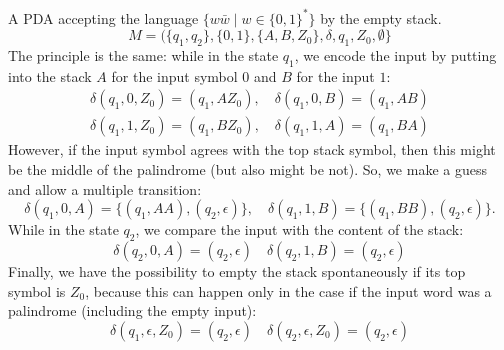 

\setcounter{section}{6}
\setcounter{subsection}{1}
\setcounter{dfn}{5}

\begin{exl}
\label{exl:Palindromes}
A PDA accepting the language $\{w \bar{w} \mid w \in \{0,1\}^*\}$ by the empty stack.
\[
M = (\{q_1, q_2\}, \{0, 1\}, \{A, B, Z_0\}, \delta, q_1, Z_0, \emptyset\}
\]
The principle is the same: while in the state $q_1$, we encode the input by putting into the stack $A$ for the input symbol $0$ and $B$ for the input $1$:
\begin{gather*}
\delta(q_1, 0, Z_0) = (q_1, AZ_0), \quad \delta(q_1, 0, B) = (q_1, AB)\\
\delta(q_1, 1, Z_0) = (q_1, BZ_0), \quad \delta(q_1, 1, A) = (q_1, BA)
\end{gather*}
However, if the input symbol agrees with the top stack symbol, then this might be the middle of the palindrome (but also might be not).
So, we make a guess and allow a multiple transition:
\[
\delta(q_1, 0, A) = \{(q_1, AA), (q_2, \epsilon)\}, \quad \delta(q_1, 1, B) = \{(q_1, BB), (q_2, \epsilon)\}.
\]
While in the state $q_2$, we compare the input with the content of the stack:
\[
\delta(q_2, 0, A) = (q_2, \epsilon) \quad \delta(q_2, 1, B) = (q_2, \epsilon)
\]
Finally, we have the possibility to empty the stack spontaneously if its top symbol is $Z_0$,
because this can happen only in the case if the input word was a palindrome (including the empty input):
\[
\delta(q_1, \epsilon, Z_0) = (q_2, \epsilon) \quad \delta(q_2, \epsilon, Z_0) = (q_2, \epsilon)
\]
\end{exl}


